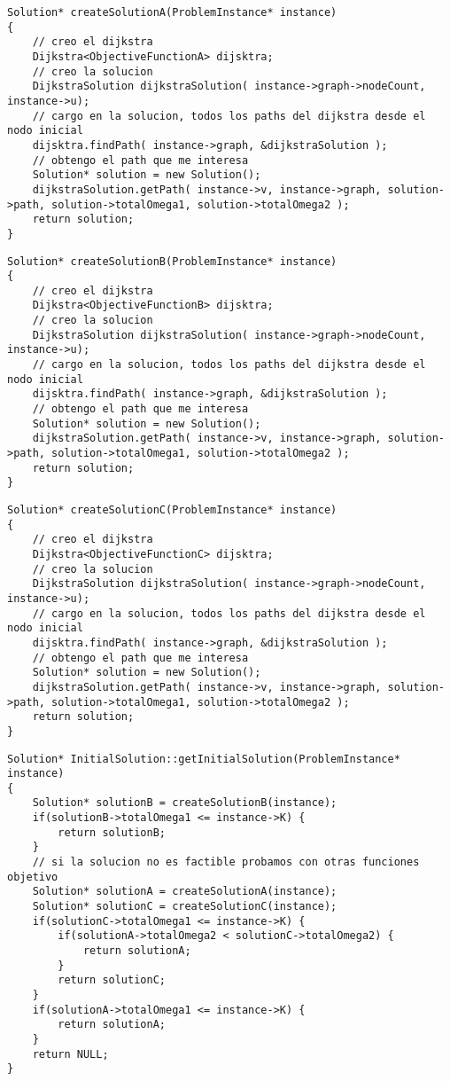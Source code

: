 \begin{lstlisting}[caption=createSolutionA()]
Solution* createSolutionA(ProblemInstance* instance) 
{    
    // creo el dijkstra
    Dijkstra<ObjectiveFunctionA> dijsktra;
    // creo la solucion
    DijkstraSolution dijkstraSolution( instance->graph->nodeCount, instance->u);
    // cargo en la solucion, todos los paths del dijkstra desde el nodo inicial
    dijsktra.findPath( instance->graph, &dijkstraSolution );
    // obtengo el path que me interesa
    Solution* solution = new Solution();    
    dijkstraSolution.getPath( instance->v, instance->graph, solution->path, solution->totalOmega1, solution->totalOmega2 );
    return solution;
}
\end{lstlisting}
\begin{lstlisting}[caption=createSolutionB()]
Solution* createSolutionB(ProblemInstance* instance) 
{
    // creo el dijkstra    
    Dijkstra<ObjectiveFunctionB> dijsktra;
    // creo la solucion
    DijkstraSolution dijkstraSolution( instance->graph->nodeCount, instance->u);
    // cargo en la solucion, todos los paths del dijkstra desde el nodo inicial
    dijsktra.findPath( instance->graph, &dijkstraSolution );
    // obtengo el path que me interesa
    Solution* solution = new Solution();    
    dijkstraSolution.getPath( instance->v, instance->graph, solution->path, solution->totalOmega1, solution->totalOmega2 );
    return solution;
}
\end{lstlisting}
\begin{lstlisting}[caption=createSolutionC()]
Solution* createSolutionC(ProblemInstance* instance) 
{
    // creo el dijkstra    
    Dijkstra<ObjectiveFunctionC> dijsktra;
    // creo la solucion
    DijkstraSolution dijkstraSolution( instance->graph->nodeCount, instance->u);
    // cargo en la solucion, todos los paths del dijkstra desde el nodo inicial
    dijsktra.findPath( instance->graph, &dijkstraSolution );
    // obtengo el path que me interesa
    Solution* solution = new Solution();    
    dijkstraSolution.getPath( instance->v, instance->graph, solution->path, solution->totalOmega1, solution->totalOmega2 );
    return solution;
}
\end{lstlisting}
\begin{lstlisting}[caption=InitialSolution::getInitialSolution()]
Solution* InitialSolution::getInitialSolution(ProblemInstance* instance)
{   
    Solution* solutionB = createSolutionB(instance);    
    if(solutionB->totalOmega1 <= instance->K) {
        return solutionB;
    }
    // si la solucion no es factible probamos con otras funciones objetivo    
    Solution* solutionA = createSolutionA(instance);
    Solution* solutionC = createSolutionC(instance);
    if(solutionC->totalOmega1 <= instance->K) {
        if(solutionA->totalOmega2 < solutionC->totalOmega2) {
            return solutionA;
        } 
        return solutionC;
    }
    if(solutionA->totalOmega1 <= instance->K) {
        return solutionA;
    }
    return NULL;    
}
\end{lstlisting}

